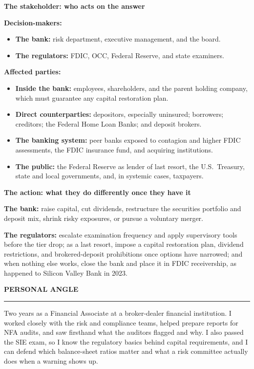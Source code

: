 \documentclass[11pt,letterpaper]{article}
\newcommand{\sectionhead}[1]{%
  \vspace{6pt}%
  {\sffamily\bfseries\fontsize{9.5}{12}\selectfont\color{navy}\MakeUppercase{#1}}\par
  \vspace{-9pt}\textcolor{hairline}{\rule{\textwidth}{0.5pt}}\par\vspace{0pt}}
\newcommand{\sublabel}[1]{{\sffamily\bfseries\fontsize{9}{11}\selectfont\color{midgray}#1}\par\vspace{2pt}}
\newcommand{\answer}[1]{#1\par\vspace{3pt}}
\begin{document}
\sublabel{The stakeholder: who acts on the answer}
\answer{\textbf{Decision-makers:}
\begin{itemize}[topsep=1pt,itemsep=1pt,leftmargin=14pt,label=\textcolor{navy}{\footnotesize\textbullet}]
  \item \textbf{The bank:} risk department, executive management, and the board.
  \item \textbf{The regulators:} FDIC, OCC, Federal Reserve, and state examiners.
\end{itemize}

\textbf{Affected parties:}
\begin{itemize}[topsep=1pt,itemsep=1pt,leftmargin=14pt,label=\textcolor{navy}{\footnotesize\textbullet}]
  \item \textbf{Inside the bank:} employees, shareholders, and the parent holding company, which must guarantee any capital restoration plan.
  \item \textbf{Direct counterparties:} depositors, especially uninsured; borrowers; creditors; the Federal Home Loan Banks; and deposit brokers.
  \item \textbf{The banking system:} peer banks exposed to contagion and higher FDIC assessments, the FDIC insurance fund, and acquiring institutions.
  \pagebreak
  \item \textbf{The public:} the Federal Reserve as lender of last resort, the U.S.\ Treasury, state and local governments, and, in systemic cases, taxpayers.
\end{itemize}}

\sublabel{The action: what they do differently once they have it}
\answer{\textbf{The bank:} raise capital, cut dividends, restructure the securities portfolio and deposit mix, shrink risky exposures, or pursue a voluntary merger.

\textbf{The regulators:} escalate examination frequency and apply supervisory tools before the tier drop; as a last resort, impose a capital restoration plan, dividend restrictions, and brokered-deposit prohibitions once options have narrowed; and when nothing else works, close the bank and place it in FDIC receivership, as happened to Silicon Valley Bank in 2023.}

\sectionhead{Personal angle}
\answer{Two years as a Financial Associate at a broker-dealer financial institution. I worked closely with the risk and compliance teams, helped prepare reports for NFA audits, and saw firsthand what the auditors flagged and why. I also passed the SIE exam, so I know the regulatory basics behind capital requirements, and I can defend which balance-sheet ratios matter and what a risk committee actually does when a warning shows up.}
\end{document}

